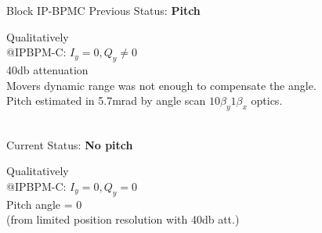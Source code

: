 Block IP-BPMC
Previous Status: \textbf{Pitch}\\
\begin{minipage}{0.5\textwidth}
\end{minipage}\hfill\hspace*{-2cm}\vspace*{2cm}
\begin{minipage}{0.5\textwidth}
Qualitatively\\
@IPBPM-C: $I_y=0, Q_y\neq0$\\
40db attenuation\\
Movers dynamic range was not enough to compensate the angle.\\
Pitch estimated in 5.7mrad by angle scan $10\beta_y1\beta_x$ optics.
\end{minipage}\\
\vspace*{-2.0cm}
Current Status: \textbf{No pitch}\\
\begin{minipage}{0.5\textwidth}
\end{minipage}\hfill\hspace*{-2cm}
\begin{minipage}{0.5\textwidth}
Qualitatively\\
@IPBPM-C: $I_y=0, Q_y=0$\\
Pitch angle = 0\\
(from limited position resolution with 40db att.)
\end{minipage}\\

